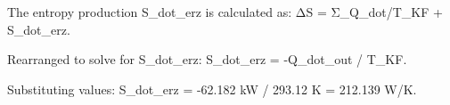 The entropy production S_dot_erz is calculated as:  
ΔS = Σ_Q_dot/T_KF + S_dot_erz.  

Rearranged to solve for S_dot_erz:  
S_dot_erz = -Q_dot_out / T_KF.  

Substituting values:  
S_dot_erz = -62.182 kW / 293.12 K = 212.139 W/K.